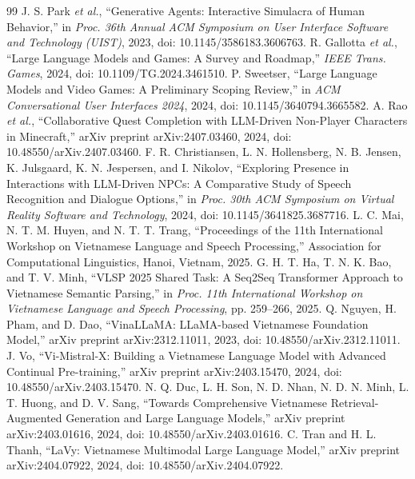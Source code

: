 ﻿\documentclass[a4paper,12pt]{article}
\begin{document}
\begin{thebibliography}{99}
 J. S. Park \emph{et al.}, ``Generative Agents: Interactive Simulacra of Human Behavior,'' in \emph{Proc. 36th Annual ACM Symposium on User Interface Software and Technology (UIST)}, 2023, doi: 10.1145/3586183.3606763.
 R. Gallotta \emph{et al.}, ``Large Language Models and Games: A Survey and Roadmap,'' \emph{IEEE Trans. Games}, 2024, doi: 10.1109/TG.2024.3461510.
 P. Sweetser, ``Large Language Models and Video Games: A Preliminary Scoping Review,'' in \emph{ACM Conversational User Interfaces 2024}, 2024, doi: 10.1145/3640794.3665582.
 A. Rao \emph{et al.}, ``Collaborative Quest Completion with LLM-Driven Non-Player Characters in Minecraft,'' arXiv preprint arXiv:2407.03460, 2024, doi: 10.48550/arXiv.2407.03460.
 F. R. Christiansen, L. N. Hollensberg, N. B. Jensen, K. Julsgaard, K. N. Jespersen, and I. Nikolov, ``Exploring Presence in Interactions with LLM-Driven NPCs: A Comparative Study of Speech Recognition and Dialogue Options,'' in \emph{Proc. 30th ACM Symposium on Virtual Reality Software and Technology}, 2024, doi: 10.1145/3641825.3687716.
 L. C. Mai, N. T. M. Huyen, and N. T. T. Trang, ``Proceedings of the 11th International Workshop on Vietnamese Language and Speech Processing,'' Association for Computational Linguistics, Hanoi, Vietnam, 2025.
 G. H. T. Ha, T. N. K. Bao, and T. V. Minh, ``VLSP 2025 Shared Task: A Seq2Seq Transformer Approach to Vietnamese Semantic Parsing,'' in \emph{Proc. 11th International Workshop on Vietnamese Language and Speech Processing}, pp. 259--266, 2025.
 Q. Nguyen, H. Pham, and D. Dao, ``VinaLLaMA: LLaMA-based Vietnamese Foundation Model,'' arXiv preprint arXiv:2312.11011, 2023, doi: 10.48550/arXiv.2312.11011.
 J. Vo, ``Vi-Mistral-X: Building a Vietnamese Language Model with Advanced Continual Pre-training,'' arXiv preprint arXiv:2403.15470, 2024, doi: 10.48550/arXiv.2403.15470.
 N. Q. Duc, L. H. Son, N. D. Nhan, N. D. N. Minh, L. T. Huong, and D. V. Sang, ``Towards Comprehensive Vietnamese Retrieval-Augmented Generation and Large Language Models,'' arXiv preprint arXiv:2403.01616, 2024, doi: 10.48550/arXiv.2403.01616.
 C. Tran and H. L. Thanh, ``LaVy: Vietnamese Multimodal Large Language Model,'' arXiv preprint arXiv:2404.07922, 2024, doi: 10.48550/arXiv.2404.07922.

\end{thebibliography}
\end{document}
